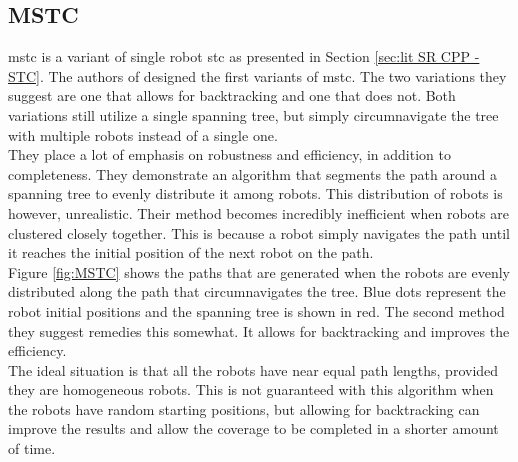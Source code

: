 \subsection{MSTC}
\label{subsec:mstc}
\ac{mstc} is a variant of single robot \ac{stc} as presented in Section \ref{sec:lit SR CPP - STC}. The authors of \cite{Hazon2005} designed the first variants of \ac{mstc}. The two variations they suggest are one that allows for backtracking and one that does not. Both variations still utilize a single spanning tree, but simply circumnavigate the tree with multiple robots instead of a single one.\\
They place a lot of emphasis on robustness and efficiency, in addition to completeness. They demonstrate an algorithm that segments the path around a spanning tree to evenly distribute it among robots. This distribution of robots is however, unrealistic. Their method becomes incredibly inefficient when robots are clustered closely together. This is because a robot simply navigates the path until it reaches the initial position of the next robot on the path.\\
Figure \ref{fig:MSTC} shows the paths that are generated when the robots are evenly distributed along the path that circumnavigates the tree. Blue dots represent the robot initial positions and the spanning tree is shown in red. The second method they suggest remedies this somewhat. It allows for backtracking and improves the efficiency.\\
The ideal situation is that all the robots have near equal path lengths, provided they are homogeneous robots. This is not guaranteed with this algorithm when the robots have random starting positions, but allowing for backtracking can improve the results and allow the coverage to be completed in a shorter amount of time.\\
